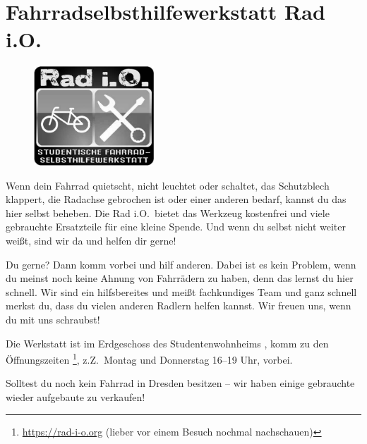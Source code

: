 \section*{Fahrradselbsthilfewerkstatt Rad i.O.}
\begin{figure}%
  \includegraphics[width=0.4\textwidth]{./radio-logo-gray.jpg}
\end{figure}
%
Wenn dein Fahrrad quietscht, nicht leuchtet oder schaltet, das Schutzblech klappert, die Radachse gebrochen ist oder einer anderen  bedarf, kannst du das hier selbst beheben.
Die Rad i.O.\ bietet das Werkzeug kostenfrei und viele gebrauchte Ersatzteile für eine kleine Spende.
Und wenn du selbst nicht weiter weißt, sind wir da und helfen dir gerne!

Du  gerne? Dann komm vorbei und hilf anderen. Dabei ist es kein Problem, wenn du meinst noch keine Ahnung von Fahrrädern zu haben, denn das lernst du hier schnell. Wir sind ein hilfsbereites und meißt fachkundiges Team und ganz schnell merkst du, dass du vielen anderen Radlern helfen kannst. Wir freuen uns, wenn du mit uns schraubst!

Die Werkstatt ist im Erdgeschoss des Studentenwohnheims , komm zu den Öffnungszeiten%
\footnote{\url{https://rad-i-o.org} (lieber vor einem Besuch nochmal nachschauen)}, z.Z.\ Montag und Donnerstag 16--19 Uhr, vorbei.

Solltest du noch kein Fahrrad in Dresden besitzen -- wir haben einige gebrauchte wieder aufgebaute zu verkaufen!
